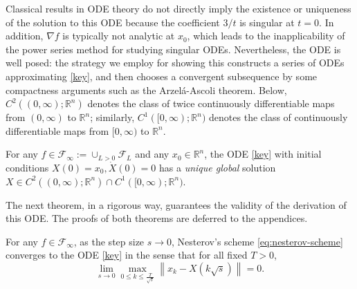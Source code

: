 \documentclass[twoside,11pt]{article}
\newcommand{\der}[1]{\dot #1}
\newcommand{\R}{\mathbb{R}}
\newcommand{\goto}{\rightarrow}
\begin{document}
Classical results in ODE theory do not directly imply the existence or
uniqueness of the solution to this ODE because the coefficient $3/t$
is singular at $t=0$. In addition, $\nabla f$ is typically not
analytic at $x_0$, which leads to the inapplicability of the power
series method for studying singular ODEs. Nevertheless, the ODE is
well posed: the strategy we employ for showing this constructs a
series of ODEs approximating \eqref{key}, and then chooses a convergent
subsequence by some compactness arguments such as the Arzel\'a-Ascoli
theorem. Below, $C^{2}((0,\infty);\R^n)$ denotes the class of twice continuously differentiable maps from $(0, \infty)$ to $\R^n$; similarly, $C^{1}([0,\infty);\R^n)$ denotes the class of continuously differentiable maps from $[0, \infty)$ to $\R^n$.
\begin{theorem}\label{thm:regularity}
For any $f\in\mathcal{F}_{\infty} :=  \cup_{L > 0}\mathcal{F}_L$ and any $x_0\in\R^n$, the ODE \eqref{key} with initial conditions $X(0) = x_0, \der{X}(0) = 0$ has a \textit{unique global} solution $X\in C^{2}((0,\infty);\R^n)\cap C^{1}([0,\infty);\R^n)$.
\end{theorem}
The next theorem, in a rigorous way, guarantees the validity of the derivation of this ODE. The proofs of both theorems are deferred to the appendices.

\begin{theorem}\label{thm:nesterov_limit}
For any $f \in \mathcal{F}_{\infty}$, as the step size $s \goto 0$, Nesterov's scheme \eqref{eq:nesterov-scheme} converges to the ODE \eqref{key} in the sense that for all fixed $T > 0$,
\[
\lim_{s\goto 0}\max_{0 \le k \le \frac{T}{\sqrt{s}}}\left\| x_k - X\left( k\sqrt{s} \right) \right\| = 0.
\] 

\end{theorem}
\end{document}
